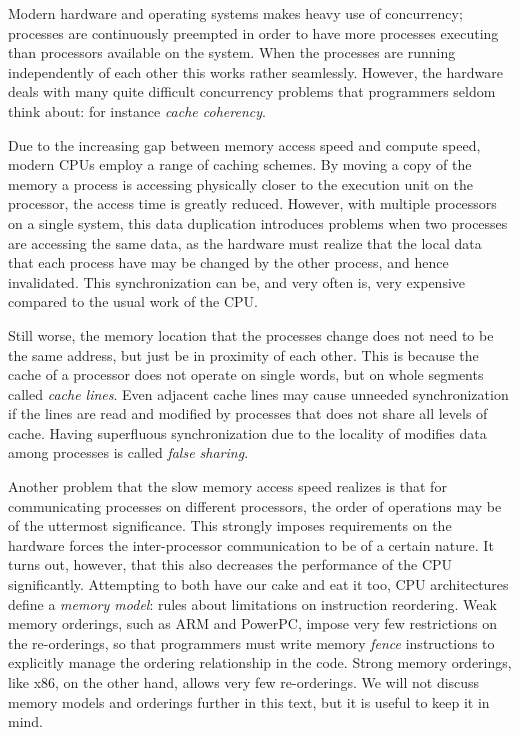 Modern hardware and operating systems makes heavy use of concurrency; processes are continuously
preempted in order to have more processes executing than processors available on the system.  When
the processes are running independently of each other this works rather seamlessly.  However, the
hardware deals with many quite difficult concurrency problems that programmers seldom think about:
for instance \emph{cache coherency}.

Due to the increasing gap between memory access speed and compute speed, modern CPUs employ a range
of caching schemes. By moving a copy of the memory a process is accessing physically closer to the
execution unit on the processor, the access time is greatly reduced. However, with multiple
processors on a single system, this data duplication introduces problems when two processes are
accessing the same data, as the hardware must realize that the local data that each process have
may be changed by the other process, and hence invalidated. This synchronization can be, and very
often is, very expensive compared to the usual work of the CPU\@.

Still worse, the memory location that the processes change does not need to be the same address,
but just be in proximity of each other. This is because the cache of a processor does not operate
on single words, but on whole segments called \emph{cache lines}. Even adjacent cache lines may
cause unneeded synchronization if the lines are read and modified by processes that does not share
all levels of cache. Having superfluous synchronization due to the locality of modifies data among
processes is called \emph{false sharing}.

Another problem that the slow memory access speed realizes is that for communicating processes on
different processors, the order of operations may be of the uttermost significance. This strongly
imposes requirements on the hardware forces the inter-processor communication to be of a certain
nature. It turns out, however, that this also decreases the performance of the CPU significantly.
Attempting to both have our cake and eat it too, CPU architectures define a \emph{memory model}:
rules about limitations on instruction reordering. Weak memory orderings, such as ARM and PowerPC,
impose very few restrictions on the re-orderings, so that programmers must write memory \emph{fence}
instructions to explicitly manage the ordering relationship in the code. Strong memory orderings,
like x86, on the other hand, allows very few re-orderings. We will not discuss memory models and
orderings further in this text, but it is useful to keep it in mind.

